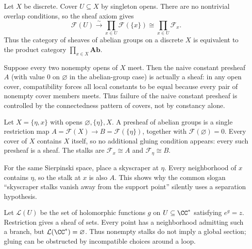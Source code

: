 \begin{example}
Let $X$ be discrete.  Cover $U\subseteq X$ by singleton opens.  There are no nontrivial
overlap conditions, so the sheaf axiom gives
\[
\mathcal F(U)\xrightarrow{\sim}\prod_{x\in U}\mathcal F(\{x\})
\cong\prod_{x\in U}\mathcal F_x.
\]
Thus the category of sheaves of abelian groups on a discrete $X$ is equivalent to the
product category $\prod_{x\in X}\mathbf{Ab}$.
\end{example}

\begin{example}
Suppose every two nonempty opens of $X$ meet.  Then the naive constant presheaf $A$ (with
value $0$ on $\varnothing$ in the abelian-group case) is actually a sheaf: in any open
cover, compatibility forces all local constants to be equal because every pair of nonempty
cover members meets.  Thus failure of the naive constant presheaf is controlled by the
connectedness pattern of covers, not by constancy alone.
\end{example}

\begin{example}
Let $X=\{\eta,x\}$ with opens $\varnothing,\{\eta\},X$.  A presheaf of abelian groups is a
single restriction map $A=\mathcal F(X)\to B=\mathcal F(\{\eta\})$, together with
$\mathcal F(\varnothing)=0$.  Every cover of $X$ contains $X$ itself, so no additional
gluing condition appears: every such presheaf is a sheaf.  The stalks are
$\mathcal F_x\cong A$ and $\mathcal F_\eta\cong B$.
\end{example}

\begin{example}
For the same Sierpinski space, place a skyscraper at $\eta$.  Every neighborhood of $x$
contains $\eta$, so the stalk at $x$ is also $A$.  This shows why the common slogan
``skyscraper stalks vanish away from the support point'' silently uses a separation
hypothesis.
\end{example}

\begin{example}
Let $\mathcal L(U)$ be the set of holomorphic functions $g$ on $U\subseteq\CC^*$ satisfying
$e^g=z$.  Restriction gives a sheaf of sets.  Every point has a neighborhood admitting such
a branch, but $\mathcal L(\CC^*)=\varnothing$.  Thus nonempty stalks do not imply a global
section; gluing can be obstructed by incompatible choices around a loop.
\end{example}

